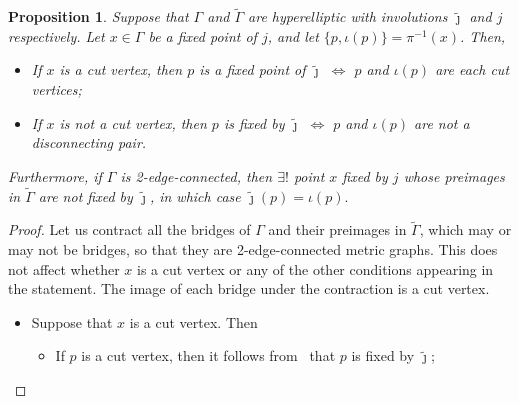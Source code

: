 \documentclass[11pt]{article}
\newtheorem{prop}[theo]{Proposition}
\theoremstyle{definition}
\numberwithin{equation}{section}
\theoremstyle{definition}
\newcommand{\tGa}{\widetilde{\Gamma}}
\newcommand{\Ga}{\Gamma}
\newcommand{\tj}{\widetilde{\jmath}}
\newcommand{\wt}[1]{\widetilde{#1}}
\begin{document}
{\begin{prop}\label{fixedpoints}
Suppose that $\Gamma$ and $\wt\Gamma$ are hyperelliptic with involutions  $\tj$ and $j$ respectively.  Let $x\in \Ga$ be a fixed point of $j$, and let $\{p,\iota(p)\}=\pi^{-1}(x)$. Then, 
    \begin{itemize}
        \item[i)] If $x$ is a cut vertex, then $p$ is a fixed point of $\tj$ $\Longleftrightarrow $ $p$ and $\iota(p)$ are each cut vertices;
        \item[ii)]  If $x$ is not a cut vertex, then $p$ is fixed by $\tj$ $\Longleftrightarrow $ $p$ and $\iota(p)$ are not a disconnecting pair.
    \end{itemize}

    \noindent Furthermore, if $\Gamma$ is 2-edge-connected, then $\exists!$  point $x$ fixed by $j$  whose preimages in $\tGa$ are not fixed by $\tj$, in which case $\tj(p)=\iota(p).$ 
    \end{prop}
    
    \begin{proof}    Let us contract all the bridges of $\Gamma$ and their preimages in $\tGa$, which may or may not be bridges, so that they are 2-edge-connected metric graphs. This does not affect whether $x$ is a cut vertex or any of the other conditions appearing in the statement. 
    The image of each bridge under the contraction is  a cut vertex. 
        \begin{itemize}
            \item [i)] Suppose that $x$ is a cut vertex. Then
            \begin{itemize}
                \item [$(\Leftarrow)$] If $p$ is a cut vertex, then it follows from~\cite[Lemma 3.10]{CH} that $p$ is fixed by $\tj$;
                

\end{itemize}
\end{itemize}
\end{proof}}
\end{document}
